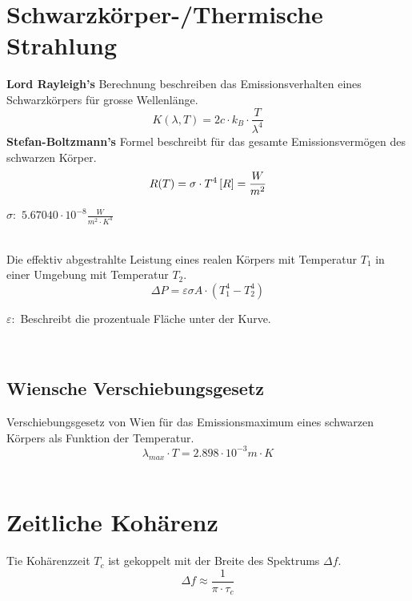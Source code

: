 \section{Schwarzkörper-/Thermische Strahlung}
\textbf{Lord Rayleigh's} Berechnung beschreiben das Emissionsverhalten eines Schwarzkörpers für grosse Wellenlänge.\
\[
	K(\lambda,T)=2c \cdot k_B\cdot \frac{T}{\lambda^4}
\]
\textbf{Stefan-Boltzmann's} Formel beschreibt für das gesamte Emissionsvermögen des schwarzen Körper.\
\[
	R(T)=\sigma \cdot T^4 
	\\ \left[ R\right]  =\frac{W}{m^2} \\ \\
\]
\begin{footnotesize}
	$\sigma:$	$5.67040 \cdot 10^{-8} \frac{W}{m^2\cdot K^4}$ \\
\end{footnotesize}
\\
Die effektiv abgestrahlte Leistung eines realen Körpers mit Temperatur $T_1$ in einer Umgebung mit Temperatur $T_2$.\
\[
	\Delta P = \varepsilon \sigma A\cdot (T_1^4-T_2^4)
\]
\begin{footnotesize}
	$\varepsilon:$	Beschreibt die prozentuale Fläche unter der Kurve. \\
\end{footnotesize}
\\
\subsection{Wiensche Verschiebungsgesetz}
Verschiebungsgesetz von Wien für das Emissionsmaximum eines schwarzen Körpers als Funktion der Temperatur.\
\[
	\lambda_{max} \cdot T = 2.898 \cdot 10^{-3}m\cdot K
\]
\\
\section{Zeitliche Kohärenz}
Tie Kohärenzzeit $T_c$ ist gekoppelt mit der Breite des Spektrums $\Delta f$.\
\[
	\Delta f \approx \frac{1}{\pi\cdot \tau_c}
\]

